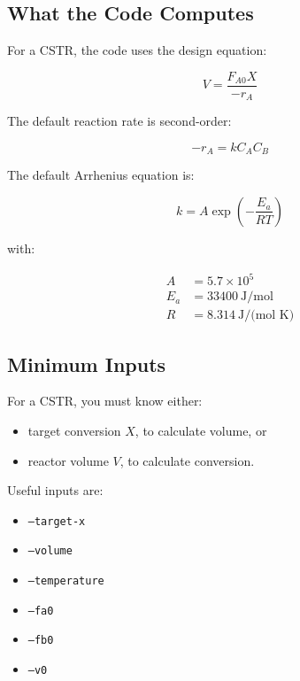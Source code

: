 \documentclass[11pt]{article}
\begin{document}
\subsection{What the Code Computes}

For a CSTR, the code uses the design equation:

\begin{equation}
V = \frac{F_{A0}X}{-r_A}
\end{equation}

The default reaction rate is second-order:

\begin{equation}
-r_A = k C_A C_B
\end{equation}

The default Arrhenius equation is:

\begin{equation}
k = A\exp\left(-\frac{E_a}{RT}\right)
\end{equation}

with:

\begin{align*}
A &= 5.7\times10^5 \\
E_a &= 33400\ \text{J/mol} \\
R &= 8.314\ \text{J/(mol K)}
\end{align*}

\subsection{Minimum Inputs}

For a CSTR, you must know either:

\begin{itemize}
    \item target conversion $X$, to calculate volume, or
    \item reactor volume $V$, to calculate conversion.
\end{itemize}

Useful inputs are:

\begin{itemize}
    \item \texttt{--target-x}
    \item \texttt{--volume}
    \item \texttt{--temperature}
    \item \texttt{--fa0}
    \item \texttt{--fb0}
    \item \texttt{--v0}
\end{itemize}
\end{document}
